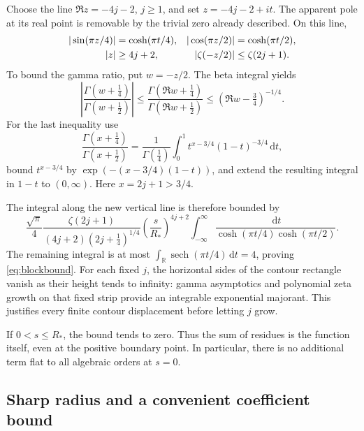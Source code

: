 \documentclass[11pt,a4paper]{article}
\numberwithin{equation}{section}
\theoremstyle{definition}
\newcommand{\R}{\mathbb R}
\newcommand{\dd}{\,\mathrm d}
\newcommand{\gfour}{\Gamma(\tfrac14)}
\begin{document}
Choose the line $\Re z=-4j-2$, $j\ge1$, and set
$z=-4j-2+it$. The apparent pole at its real point is removable by the
trivial zero already described. On this line,
\begin{align}
 |\sin(\pi z/4)|&=\cosh(\pi t/4),&
 |\cos(\pi z/2)|&=\cosh(\pi t/2),\notag\\
 |z|&\ge4j+2,&|\zeta(-z/2)|&\le\zeta(2j+1).
 \label{eq:linebounds}
\end{align}
To bound the gamma ratio, put $w=-z/2$. The beta integral yields
\begin{equation}
 \left|\frac{\Gamma(w+\frac14)}{\Gamma(w+\frac12)}\right|
 \le\frac{\Gamma(\Re w+\frac14)}{\Gamma(\Re w+\frac12)}
 \le(\Re w-\tfrac34)^{-1/4}.
 \label{eq:gammaratiobound}
\end{equation}
For the last inequality use
\[
 \frac{\Gamma(x+\frac14)}{\Gamma(x+\frac12)}
 =\frac1{\gfour}\int_0^1 t^{x-3/4}(1-t)^{-3/4}\dd t,
\]
bound $t^{x-3/4}$ by $\exp(-(x-3/4)(1-t))$, and extend the resulting
integral in $1-t$ to $(0,\infty)$. Here $x=2j+1>3/4$.

The integral along the new vertical line is therefore bounded by
\[
 \frac{\sqrt\pi}{4}\frac{\zeta(2j+1)}
 {(4j+2)(2j+\frac14)^{1/4}}
 \left(\frac s{R_*}\right)^{4j+2}
 \int_{-\infty}^{\infty}
 \frac{\dd t}{\cosh(\pi t/4)\cosh(\pi t/2)}.
\]
The remaining integral is at most
$\int_{\R}\operatorname{sech}(\pi t/4)\dd t=4$, proving
\eqref{eq:blockbound}. For each fixed $j$, the horizontal sides of the
contour rectangle vanish as their height tends to infinity: gamma
asymptotics and polynomial zeta growth on that fixed strip provide an
integrable exponential majorant. This justifies every finite contour
displacement before letting $j$ grow.

If $0<s\le R_*$, the bound tends to zero. Thus the sum of residues is
the function itself, even at the positive boundary point. In particular,
there is no additional term flat to all algebraic orders at $s=0$.

\subsection{Sharp radius and a convenient coefficient bound}
\end{document}
